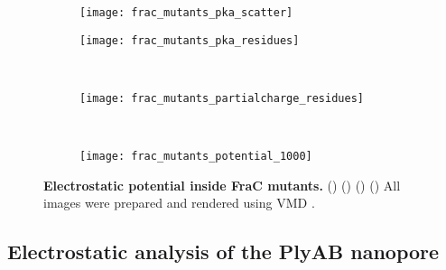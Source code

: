 \begin{figure*}[t]
  \centering
  \medskip
  \begin{subfigure}[t]{50mm}
    \centering
    \caption{}\vspace{-2.5mm}\hspace{1.5mm}\label{fig:frac_mutants_pka_scatter}
    \texttt{[image: frac\_mutants\_pka\_scatter]}
  \end{subfigure}
  \hspace{-4mm}
  \begin{subfigure}[t]{70mm}
    \centering
    \caption{}\vspace{-5mm}\hspace{0.0mm}\label{fig:frac_mutants_pka_residues}
    \texttt{[image: frac\_mutants\_pka\_residues]}
  \end{subfigure}
  \\ \vspace{2mm}
  \begin{subfigure}[t]{120mm}
    \centering
    \caption{}\vspace{-2.5mm}\hspace{1.5mm}\label{fig:frac_mutants_partialcharge_residues}
    \texttt{[image: frac\_mutants\_partialcharge\_residues]}
  \end{subfigure}
  \\ \vspace{-2mm}
  \begin{subfigure}[t]{120mm}
    \centering
    \caption{}\vspace{-2.5mm}\hspace{1.5mm}\label{fig:frac_mutants_potential_1000}
    \texttt{[image: frac\_mutants\_potential\_1000]}
  \end{subfigure}

\caption[Electrostatic potential inside FraC mutants.]{%
  \textbf{Electrostatic potential inside FraC mutants.}
  ()
  ()
  ()
  ()
  All images were prepared and rendered using VMD \cite{Humphrey-1996,Stone-1998}.
  }\label{fig:frac_mutants}
\end{figure*}

\subsection{Electrostatic analysis of the PlyAB nanopore}
%


